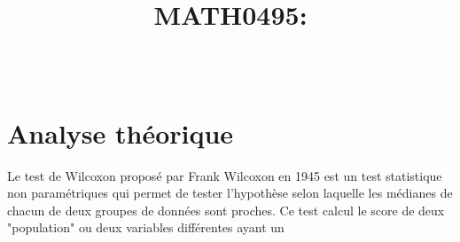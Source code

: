 \documentclass[a4paper, 11pt, oneside]{article}
\title{	MATH0495: \intitule}
\author{\PrenomUN~\textsc{\NomUN}}
\date{}
\begin{document}
\maketitle
\tableofcontents
\newpage


	\section{Analyse théorique}
	Le test de Wilcoxon proposé par Frank Wilcoxon en 1945 est un test statistique non paramétriques qui permet de tester l'hypothèse selon laquelle les médianes de chacun de deux groupes de données sont proches. Ce test calcul le score de deux "population" ou deux variables différentes ayant un

	\newpage
\end{document}
